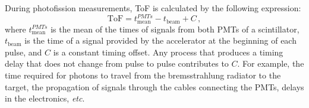 During photofission measurements, ToF is calculated by the following expression:
\begin{equation}
\label{eq:ToF}
\text{ToF} = t^{PMTs}_{\text{mean}} - t_{\text{beam}} + C \, ,
\end{equation}
where $t^{PMTs}_{\text{mean}}$ is the mean of the times of signals from both PMTs of a scintillator, $t_{\text{beam}}$ is the time of a signal provided by the accelerator at the beginning of each pulse, and $C$ is a constant timing offset.
Any process that produces a timing delay that does not change from pulse to pulse contributes to $C$.
For example, the time required for photons to travel from the bremsstrahlung radiator to the target, the propagation of signals through the cables connecting the PMTs, delays in the electronics, {\em{etc}}.

\begin{figure}[]
\centering
     \figToFNewline

\end{figure}
